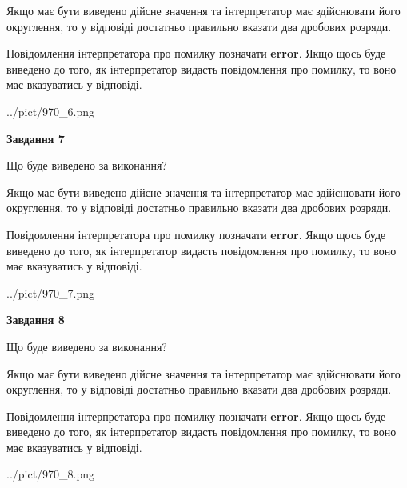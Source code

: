 \documentclass[12pt, ukrainian]{article}
\begin{document}
{\begin {Large}
Якщо має бути виведено дійсне значення та інтерпретатор має здійснювати його округлення, 
то у відповіді достатньо правильно вказати два дробових розряди.

Повідомлення інтерпретатора про помилку позначати \textbf{error}.
Якщо щось буде виведено до того, як інтерпретатор видасть повідомлення про помилку, 
то воно має вказуватись у відповіді. \par

\begin{center}
	{../pict/970_6.png}
\end{center}
\newpage

{\begin {center}\textbf{Завдання 7}\end {center}}\par
Що буде виведено за виконання? \par

Якщо має бути виведено дійсне значення та інтерпретатор має здійснювати його округлення, 
то у відповіді достатньо правильно вказати два дробових розряди.

Повідомлення інтерпретатора про помилку позначати \textbf{error}.
Якщо щось буде виведено до того, як інтерпретатор видасть повідомлення про помилку, 
то воно має вказуватись у відповіді. \par

\begin{center}
	{../pict/970_7.png}
\end{center}
\newpage

{\begin {center}\textbf{Завдання 8}\end {center}}\par
Що буде виведено за виконання? \par

Якщо має бути виведено дійсне значення та інтерпретатор має здійснювати його округлення, 
то у відповіді достатньо правильно вказати два дробових розряди.

Повідомлення інтерпретатора про помилку позначати \textbf{error}.
Якщо щось буде виведено до того, як інтерпретатор видасть повідомлення про помилку, 
то воно має вказуватись у відповіді. \par

\begin{center}
	{../pict/970_8.png}
\end{center}
\newpage


\end{Large}}
\end{document}
